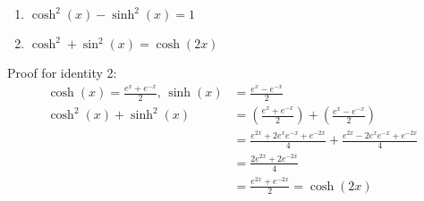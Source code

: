 \documentclass{article}
\begin{document}
\begin{enumerate}
    \item $\cosh^2(x)-\sinh^2(x)=1$
    \item $\cosh^2+\sin^2(x)=\cosh(2x)$
\end{enumerate}

Proof for identity 2:
\begin{align}
    \cosh(x)=\frac{e^x+e^{-x}}{2},\, \sinh(x)&=\frac{e^x-e^{-x}}{2} \\
    \cosh^2(x)+\sinh^2(x)&=(\frac{e^x+e^{-x}}{2})+(\frac{e^x-e^{-x}}{2}) \\
    &= \frac{e^{2x}+2e^{x}e^{-x}+e^{-2x}}{4}+\frac{e^{2x}-2e^{x}e^{-x}+e^{-2x}}{4} \\
    &= \frac{2e^{2x}+2e^{-2x}}{4} \\
    &= \frac{e^{2x}+e^{-2x}}{2}=\cosh(2x)
\end{align}
\end{document}

